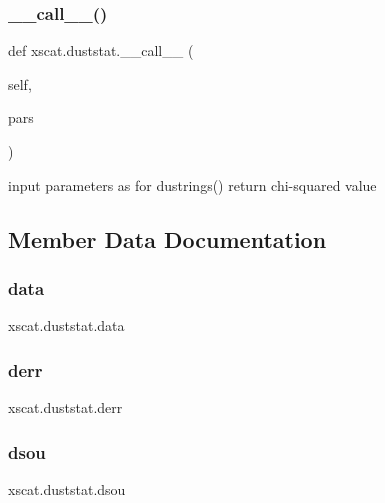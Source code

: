 \subsubsection{\texorpdfstring{\+\_\+\+\_\+call\+\_\+\+\_\+()}{\_\_call\_\_()}}
{\footnotesize\ttfamily def xscat.\+duststat.\+\_\+\+\_\+call\+\_\+\+\_\+ (\begin{DoxyParamCaption}\item[{}]{self,  }\item[{}]{pars }\end{DoxyParamCaption})}

\begin{DoxyVerb}input parameters as for dustrings()
return    chi-squared value
\end{DoxyVerb}
 

\subsection{Member Data Documentation}
\mbox{\label{classxscat_1_1duststat_a0a7cbb517da1955d48a4fa62d92fb089}} 
\subsubsection{\texorpdfstring{data}{data}}
{\footnotesize\ttfamily xscat.\+duststat.\+data}

\mbox{\label{classxscat_1_1duststat_a69e21938c11f72d93d2d72b92a703fb1}} 
\subsubsection{\texorpdfstring{derr}{derr}}
{\footnotesize\ttfamily xscat.\+duststat.\+derr}

\mbox{\label{classxscat_1_1duststat_a3ceb607b156398c43411e816e3689c11}} 
\subsubsection{\texorpdfstring{dsou}{dsou}}
{\footnotesize\ttfamily xscat.\+duststat.\+dsou}

